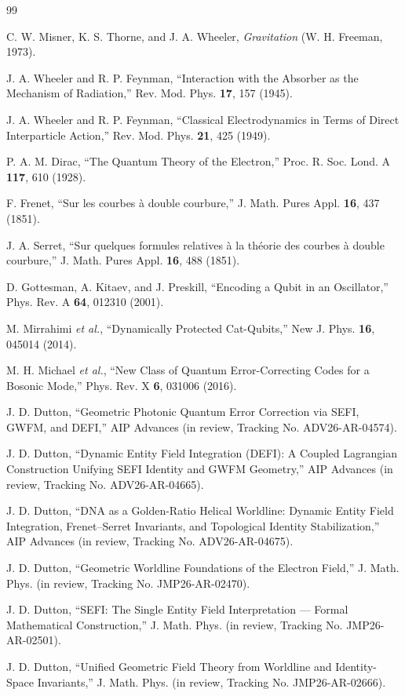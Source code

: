 \documentclass[aip,adv,reprint]{revtex4-2}
\begin{document}
\begin{thebibliography}{99}


C. W. Misner, K. S. Thorne, and J. A. Wheeler,
\textit{Gravitation} (W. H. Freeman, 1973).

J. A. Wheeler and R. P. Feynman,
``Interaction with the Absorber as the Mechanism of Radiation,''
Rev. Mod. Phys. \textbf{17}, 157 (1945).

J. A. Wheeler and R. P. Feynman,
``Classical Electrodynamics in Terms of Direct Interparticle Action,''
Rev. Mod. Phys. \textbf{21}, 425 (1949).

P. A. M. Dirac,
``The Quantum Theory of the Electron,''
Proc. R. Soc. Lond. A \textbf{117}, 610 (1928).

F. Frenet,
``Sur les courbes à double courbure,''
J. Math. Pures Appl. \textbf{16}, 437 (1851).

J. A. Serret,
``Sur quelques formules relatives à la théorie des courbes à double courbure,''
J. Math. Pures Appl. \textbf{16}, 488 (1851).

D. Gottesman, A. Kitaev, and J. Preskill,
``Encoding a Qubit in an Oscillator,''
Phys. Rev. A \textbf{64}, 012310 (2001).

M. Mirrahimi \textit{et al.},
``Dynamically Protected Cat-Qubits,''
New J. Phys. \textbf{16}, 045014 (2014).

M. H. Michael \textit{et al.},
``New Class of Quantum Error-Correcting Codes for a Bosonic Mode,''
Phys. Rev. X \textbf{6}, 031006 (2016).


J. D. Dutton,
``Geometric Photonic Quantum Error Correction via SEFI, GWFM, and DEFI,''
AIP Advances (in review, Tracking No. ADV26-AR-04574).

J. D. Dutton,
``Dynamic Entity Field Integration (DEFI): A Coupled Lagrangian Construction
Unifying SEFI Identity and GWFM Geometry,''
AIP Advances (in review, Tracking No. ADV26-AR-04665).

J. D. Dutton,
``DNA as a Golden-Ratio Helical Worldline: Dynamic Entity Field Integration,
Frenet–Serret Invariants, and Topological Identity Stabilization,''
AIP Advances (in review, Tracking No. ADV26-AR-04675).

J. D. Dutton,
``Geometric Worldline Foundations of the Electron Field,''
J. Math. Phys. (in review, Tracking No. JMP26-AR-02470).

J. D. Dutton,
``SEFI: The Single Entity Field Interpretation — Formal Mathematical Construction,''
J. Math. Phys. (in review, Tracking No. JMP26-AR-02501).

J. D. Dutton,
``Unified Geometric Field Theory from Worldline and Identity-Space Invariants,''
J. Math. Phys. (in review, Tracking No. JMP26-AR-02666).

\end{thebibliography}
\end{document}
